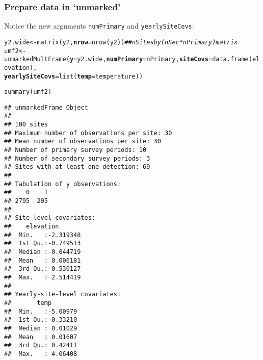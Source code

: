 \documentclass[color=usenames,dvipsnames]{beamer}\usepackage[]{graphicx}\usepackage[]{color}
\makeatletter
\newcommand{\hlcom}[1]{\textcolor[rgb]{0.514,0.506,0.514}{\textit{#1}}}%
\newcommand{\hlstd}[1]{\textcolor[rgb]{0,0,0}{#1}}%
\newcommand{\hlkwb}[1]{\textcolor[rgb]{0,0.341,0.682}{#1}}%
\newcommand{\hlkwc}[1]{\textcolor[rgb]{0,0,0}{\textbf{#1}}}%
\newcommand{\hlkwd}[1]{\textcolor[rgb]{0.004,0.004,0.506}{#1}}%
\newenvironment{kframe}{%
 \def\at@end@of@kframe{}%
 \ifinner\ifhmode%
  \def\at@end@of@kframe{\end{minipage}}%
  \begin{minipage}{\columnwidth}%
 \fi\fi%
 \def\FrameCommand##1{\hskip\@totalleftmargin \hskip-\fboxsep
 \colorbox{shadecolor}{##1}\hskip-\fboxsep
     \hskip-\linewidth \hskip-\@totalleftmargin \hskip\columnwidth}%
 \MakeFramed {\advance\hsize-\width
   \@totalleftmargin\z@ \linewidth\hsize
   \@setminipage}}%
 {\par\unskip\endMakeFramed%
 \at@end@of@kframe}
\newenvironment{knitrout}{}{} %
\newcommand{\inr}[1]{\colorbox{inlinecolor}{\texttt{#1}}}
\makeatother
\begin{document}
\begin{frame}[fragile]
  \frametitle{Prepare data in `unmarked'}
  \footnotesize
Notice the new arguments \inr{numPrimary} and \inr{yearlySiteCovs}:
\begin{knitrout}\tiny
{}\color{fgcolor}\begin{kframe}
\begin{alltt}
\hlstd{y2.wide} \hlkwb{<-} \hlkwd{matrix}\hlstd{(y2,} \hlkwc{nrow}\hlstd{=}\hlkwd{nrow}\hlstd{(y2))} \hlcom{## nSites by (nSec*nPrimary) matrix}
\hlstd{umf2} \hlkwb{<-} \hlkwd{unmarkedMultFrame}\hlstd{(}\hlkwc{y}\hlstd{=y2.wide,} \hlkwc{numPrimary}\hlstd{=nPrimary,} \hlkwc{siteCovs}\hlstd{=}\hlkwd{data.frame}\hlstd{(elevation),}
                          \hlkwc{yearlySiteCovs}\hlstd{=}\hlkwd{list}\hlstd{(}\hlkwc{temp}\hlstd{=temperature))}
\end{alltt}
\end{kframe}
\end{knitrout}
\pause

\begin{knitrout}\tiny
{}\color{fgcolor}\begin{kframe}
\begin{alltt}
\hlkwd{summary}\hlstd{(umf2)}
\end{alltt}
\begin{verbatim}
## unmarkedFrame Object
## 
## 100 sites
## Maximum number of observations per site: 30 
## Mean number of observations per site: 30 
## Number of primary survey periods: 10 
## Number of secondary survey periods: 3 
## Sites with at least one detection: 69 
## 
## Tabulation of y observations:
##    0    1 
## 2795  205 
## 
## Site-level covariates:
##    elevation        
##  Min.   :-2.319348  
##  1st Qu.:-0.749513  
##  Median :-0.044719  
##  Mean   : 0.006181  
##  3rd Qu.: 0.530127  
##  Max.   : 2.514419  
## 
## Yearly-site-level covariates:
##       temp         
##  Min.   :-5.00979  
##  1st Qu.:-0.33210  
##  Median : 0.01029  
##  Mean   : 0.01607  
##  3rd Qu.: 0.42411  
##  Max.   : 4.06408
\end{verbatim}
\end{kframe}
\end{knitrout}
\end{frame}
\end{document}
